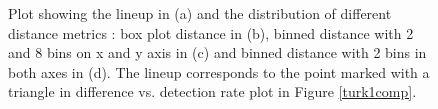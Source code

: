 \documentclass[12]{article}
\begin{document}
\begin{figure}[hbtp]
{\label{t1bin_1}
}
\label{turk1-exp}
	\vspace{-.1in}
\caption[Optional caption for list of figures]{Plot showing the lineup in (a) and the distribution of different distance metrics : box plot distance in (b), binned distance with 2 and 8 bins on x and y axis in (c) and binned distance with 2 bins in both axes in (d). The lineup corresponds to the point marked with a triangle in difference vs. detection rate plot in Figure \ref{turk1comp}.}
\end{figure}
\end{document}
